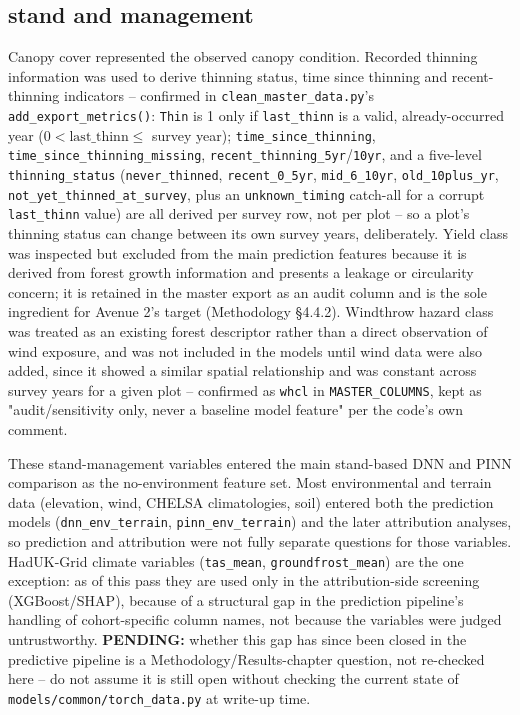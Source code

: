 \subsection{stand and management}
Canopy cover represented the observed canopy condition.
Recorded thinning information was used to derive thinning status, time since thinning and recent-thinning indicators -- confirmed in \texttt{clean\_master\_data.py}'s \texttt{add\_export\_metrics()}: \texttt{Thin} is 1 only if \texttt{last\_thinn} is a valid, already-occurred year ($0 < \text{last\_thinn} \le$ survey year); \texttt{time\_since\_thinning}, 
\texttt{time\_since\_thinning\_missing}, \texttt{recent\_thinning\_5yr}/\texttt{10yr}, and a five-level \texttt{thinning\_status} (\texttt{never\_thinned}, \texttt{recent\_0\_5yr}, \texttt{mid\_6\_10yr}, \texttt{old\_10plus\_yr}, \texttt{not\_yet\_thinned\_at\_survey}, plus an \texttt{unknown\_timing} catch-all for a corrupt \texttt{last\_thinn} value) 
are all derived per survey row, not per plot -- so a plot's thinning status can change between its own survey years, deliberately.
Yield class was inspected but excluded from the main prediction features because it is derived from forest growth information and presents a leakage or circularity concern; it is retained in the master export as an audit column and is the sole ingredient for Avenue 2's target (Methodology \S4.4.2).
Windthrow hazard class was treated as an existing forest descriptor rather than a direct observation of wind exposure, and was not included in the models until wind data were also added, since it showed a similar spatial relationship and was constant across survey years for a given plot -- confirmed as \texttt{whcl} in \texttt{MASTER\_COLUMNS}, kept as "audit/sensitivity only, never a baseline model feature" per the code's own comment.

These stand-management variables entered the main stand-based DNN and PINN comparison as the no-environment feature set.
Most environmental and terrain data (elevation, wind, CHELSA climatologies, soil) entered both the prediction models (\texttt{dnn\_env\_terrain}, \texttt{pinn\_env\_terrain}) and the later attribution analyses, so prediction and attribution were not fully separate questions for those variables.
HadUK-Grid climate variables (\texttt{tas\_mean}, \texttt{groundfrost\_mean}) are the one exception: as of this pass they are used only in the attribution-side screening (XGBoost/SHAP), because of a structural gap in the prediction pipeline's handling of cohort-specific column names, not because the variables were judged untrustworthy. \textbf{PENDING:} whether this gap has since been closed in the predictive pipeline is a Methodology/Results-chapter question, not re-checked here -- do not assume it is still open without checking the current state of \texttt{models/common/torch\_data.py} at write-up time.

